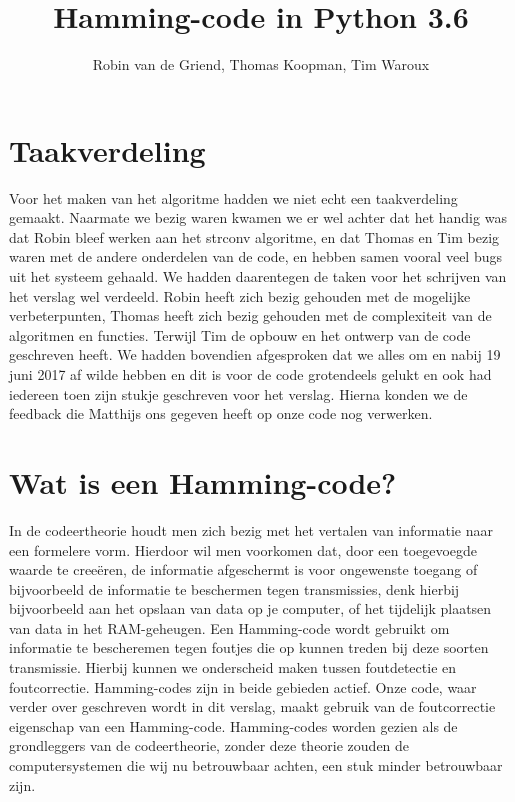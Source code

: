 \documentclass[a4paper]{article}
\begin{document}
\title{Hamming-code in Python 3.6}
\author{Robin van de Griend, Thomas Koopman, Tim Waroux}
\maketitle

\tableofcontents

\section{Taakverdeling}
Voor het maken van het algoritme hadden we niet echt een taakverdeling gemaakt. Naarmate we bezig waren kwamen we er wel achter dat het handig was dat Robin bleef werken aan het strconv algoritme, en dat Thomas en Tim bezig waren met de andere onderdelen van de code, en hebben samen vooral veel bugs uit het systeem gehaald. We hadden daarentegen de taken voor het schrijven van het verslag wel verdeeld. Robin heeft zich bezig gehouden met de mogelijke verbeterpunten, Thomas heeft zich bezig gehouden met de complexiteit van de algoritmen en functies. Terwijl Tim de opbouw en het ontwerp van de code geschreven heeft. We hadden bovendien afgesproken dat we alles om en nabij 19 juni 2017 af wilde hebben en dit is voor de code grotendeels gelukt en ook had iedereen toen zijn stukje geschreven voor het verslag. Hierna konden we de feedback die Matthijs ons gegeven heeft op onze code nog verwerken.

\section{Wat is een Hamming-code?}
In de codeertheorie houdt men zich bezig met het vertalen van informatie naar een formelere vorm. Hierdoor wil men voorkomen dat, door een toegevoegde waarde te cree\"eren, de informatie afgeschermt is voor ongewenste toegang of bijvoorbeeld de informatie te beschermen tegen transmissies, denk hierbij bijvoorbeeld aan het opslaan van data op je computer, of het tijdelijk plaatsen van data in het RAM-geheugen. Een Hamming-code wordt gebruikt om informatie te bescheremen tegen foutjes die op kunnen treden bij deze soorten transmissie. Hierbij kunnen we onderscheid maken tussen foutdetectie en foutcorrectie. Hamming-codes zijn in beide gebieden actief. Onze code, waar verder over geschreven wordt in dit verslag, maakt gebruik van de foutcorrectie eigenschap van een Hamming-code. Hamming-codes worden gezien als de grondleggers van de codeertheorie, zonder deze theorie zouden de computersystemen die wij nu betrouwbaar achten, een stuk minder betrouwbaar zijn.
\end{document}
